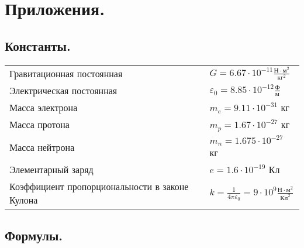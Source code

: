 \documentclass{article}
\begin{document}
\section{Приложения.}
    \subsection{Константы.}

    \begin{center}
        \begin{tabular}{ l l }
            \hline
            Гравитационная постоянная & \(G = 6.67 \cdot 10^{-11} \frac{\textrm{Н} \cdot \textrm{м}^2}{\textrm{кг}^2}\) \\ 
            Электрическая постоянная & \(\varepsilon_0 = 8.85 \cdot 10^{-12} \frac{\textrm{Ф}}{\textrm{м}}\) \\  
            Масса электрона & \(m_e = 9.11 \cdot 10^{-31} \) кг \\
            Масса протона & \(m_p = 1.67 \cdot 10^{-27} \) кг \\
            Масса нейтрона & \(m_n = 1.675 \cdot 10^{-27} \) кг \\
            Элементарный заряд & \(e = 1.6 \cdot 10^{-19} \) Кл \\
            Коэффициент пропорциональности в законе Кулона & \(k = \frac{1}{4\pi\varepsilon_0} = 9 \cdot 10^{9} \frac{\textrm{Н} \cdot \textrm{м}^2}{\textrm{Кл}^2}\) \\
            \hline
        \end{tabular}
    \end{center}

    \subsection{Формулы.}
    
\end{document}
